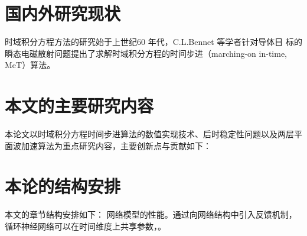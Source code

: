 

\section{国内外研究现状}
时域积分方程方法的研究始于上世纪60 年代，C.L.Bennet 等学者针对导体目
标的瞬态电磁散射问题提出了求解时域积分方程的时间步进（marching-on in-time,
MeT）算法。

\section{本文的主要研究内容}
本论文以时域积分方程时间步进算法的数值实现技术、后时稳定性问题以及两层平面波加速算法为重点研究内容，主要创新点与贡献如下：

\section{本论的结构安排}
本文的章节结构安排如下：
网络模型的性能。通过向网络结构中引入反馈机制，循环神经网络可以在时间维度上共享参数，。
